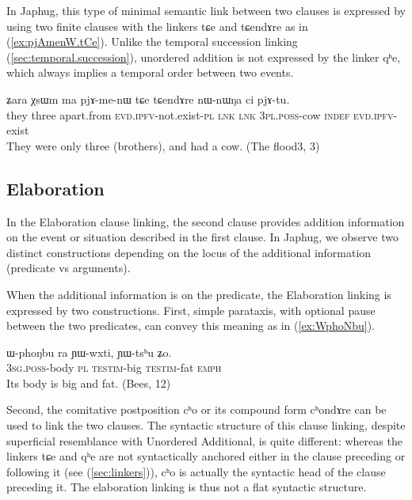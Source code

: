 \documentclass[oldfontcommands,oneside,a4paper,11pt]{article}
\newcommand{\ipa}[1]{{\phon \mbox{#1}}} %
\newcommand{\refb}[1]{(\ref{#1})}
\begin{document}
In Japhug, this type of minimal semantic link between two clauses is expressed by using two finite clauses with the linkers \ipa{tɕe} and \ipa{tɕendɤre}  as in \refb{ex:pjAmenW.tCe}. Unlike the  temporal succession linking \refb{sec:temporal.succession}, unordered addition is not expressed by  the linker \ipa{qʰe}, which   always implies a temporal order between two events.

 \begin{exe}
\ex \label{ex:pjAmenW.tCe}
\gll
\ipa{ʑara}  	\ipa{χsɯm}  	\ipa{ma}  	\ipa{pjɤ-me-nɯ}  	\ipa{tɕe}  	\ipa{tɕendɤre}  	\ipa{nɯ-nɯŋa}  	\ipa{ci}  	\ipa{pjɤ-tu.}  \\
they three apart.from \textsc{evd.ipfv}-not.exist-\textsc{pl} \textsc{lnk} \textsc{lnk} \textsc{3pl.poss}-cow \textsc{indef} \textsc{evd.ipfv}-exist \\
\glt They were only three (brothers), and had a cow. (The flood3, 3)
\end{exe}


\subsection{Elaboration} \label{sec:elaboration}
In the Elaboration clause linking, the second clause provides addition information on the event or situation described in the first clause. In Japhug, we observe two distinct constructions depending on the locus of the additional information (predicate vs arguments).


When the additional information is on the predicate, the Elaboration linking is expressed by two constructions. First, simple parataxis, with optional pause between the two predicates, can convey this meaning as in \refb{ex:WphoNbu}.

\begin{exe}
\ex \label{ex:WphoNbu}
\gll
 \ipa{ɯ-phoŋbu}  	\ipa{ra}  	\ipa{ɲɯ-wxti,}  	\ipa{ɲɯ-tsʰu}  	\ipa{ʑo.}  \\
\textsc{ 3sg.poss}-body \textsc{pl} \textsc{testim}-big \textsc{testim}-fat \textsc{emph} \\
\glt Its body is big and fat. (Bees, 12)
\end{exe}

Second,  the comitative postposition \ipa{cʰo} or its compound form  \ipa{cʰondɤre} can be used to link the two clauses. The syntactic structure of this clause linking, despite superficial resemblance with Unordered Additional, is quite different: whereas the linkers \ipa{tɕe} and \ipa{qʰe} are not syntactically anchored either in the clause preceding or following it (see \refb{sec:linkers}), \ipa{cʰo} is actually the syntactic head of the clause preceding it. The elaboration linking is thus not a flat syntactic structure.
\end{document}
